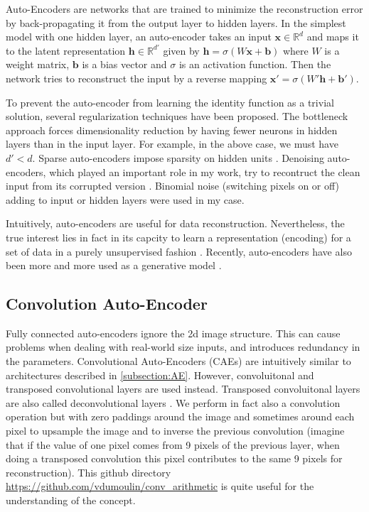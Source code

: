 Auto-Encoders are networks that are trained to minimize the reconstruction
error by back-propagating it from the output layer to hidden layers.
In the simplest model with one hidden layer, an auto-encoder takes an
input $\mathbf{x} \in \mathbb{R}^d$ and maps it to the latent
representation $\mathbf{h} \in \mathbb{R}^{d'}$ given by
$\mathbf{h} = \sigma(W\mathbf{x}+\mathbf{b})$ where $W$
is a weight matrix, $\mathbf{b}$ is a bias vector and $\sigma$ is an
activation function. Then the network tries to reconstruct the input
by a reverse mapping $\mathbf{x'} = \sigma(W'\mathbf{h}+\mathbf{b'})$.

To prevent the auto-encoder from learning the identity function as
a trivial solution, several regularization techniques have been proposed.
The bottleneck approach forces dimensionality reduction by having
fewer neurons in hidden layers than in the input layer. For example,
in the above case, we must have $d'<d$. Sparse auto-encoders impose sparsity
on hidden units \cite{A. Makhzani 2014}.
Denoising auto-encoders, which played an important role in my work,
try to recontruct the clean input from its corrupted version
\cite{P. Vincent 2008, Y. Bengio 2012}. Binomial noise
(switching pixels on or off) adding
to input or hidden layers were used in my case.

Intuitively, auto-encoders are useful for data reconstruction.
Nevertheless, the true interest lies in fact in its capcity to learn
a representation (encoding) for a set of data in a purely unsupervised
fashion \cite{P. Vincent 2010}. Recently, auto-encoders have also
been more and more used as a generative model \cite{Y. Bengio 2013}.

\subsection{Convolution Auto-Encoder}

Fully connected auto-encoders ignore the 2d image structure.
This can cause problems when dealing with real-world size inputs,
and introduces redundancy in the parameters.
Convolutional Auto-Encoders \cite{J. Masci 2011, V. Turchenko 2017}
(CAEs) are intuitively similar
to architectures described in \ref{subsection:AE}.
However, convoluitonal and transposed convolutional layers are used instead.
Transposed convoluitonal layers are also called deconvolutional
layers \cite{M. D. Zeiler 2011}.
We perform in fact also a convolution operation but with zero paddings
around the image and sometimes around each pixel to upsample the
image and to inverse the previous convolution
(imagine that if the value of one pixel comes from 9 pixels of the
previous layer, when doing a transposed convolution this pixel
contributes to the same 9 pixels for reconstruction).
This github directory
\href{https://github.com/vdumoulin/conv_arithmetic}
{https://github.com/vdumoulin/conv\_arithmetic}
is quite useful for the understanding of the concept.

